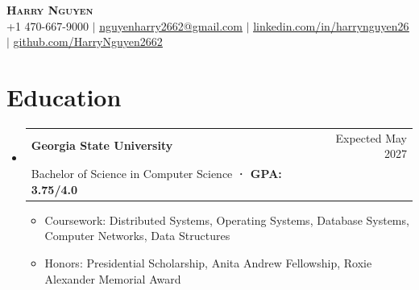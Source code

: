 \documentclass[letterpaper,11pt]{article}
\makeatletter
\newcommand{\resumeItem}[1]{\item\small{{#1 \vspace{-2pt}}}}
\newcommand{\resumeSubheading}[4]{
  \vspace{-2pt}\item
    \begin{tabular*}{0.98\textwidth}[t]{l@{\extracolsep{\fill}}r}
      \textbf{#1} & #2 \\
      {\small#3} & {\small #4} \\
    \end{tabular*}\vspace{-7pt}
}
\newcommand{\resumeSubHeadingListStart}{\begin{itemize}[leftmargin=0.15in, label={}]}
\newcommand{\resumeSubHeadingListEnd}{\end{itemize}}
\newcommand{\resumeItemListStart}{\begin{itemize}}
\newcommand{\resumeItemListEnd}{\end{itemize}\vspace{-5pt}}
\makeatother
\begin{document}
\begin{center}
    \textbf{\Huge \scshape Harry Nguyen} \\ \vspace{1pt}
    \small +1 470-667-9000 $|$
    \href{mailto:nguyenharry2662@gmail.com}{\underline{nguyenharry2662@gmail.com}} $|$
    \href{https://www.linkedin.com/in/harrynguyen26/}{\underline{linkedin.com/in/harrynguyen26}} $|$
    \href{https://github.com/HarryNguyen2662}{\underline{github.com/HarryNguyen2662}}
\end{center}

\section{Education}
  \resumeSubHeadingListStart
    \resumeSubheading
      {Georgia State University}{Expected May 2027}
      {Bachelor of Science in Computer Science \textbf{· GPA: 3.75/4.0}}{}
      \resumeItemListStart
        \resumeItem{Coursework: Distributed Systems, Operating Systems, Database Systems, Computer Networks, Data Structures}
        \resumeItem{Honors: Presidential Scholarship, Anita Andrew Fellowship, Roxie Alexander Memorial Award}
      \resumeItemListEnd
  \resumeSubHeadingListEnd
\end{document}
